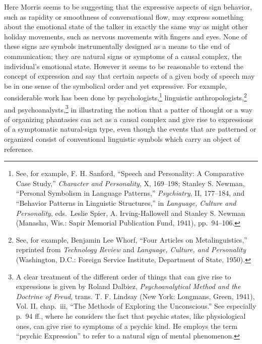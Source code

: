 \documentclass[twoside,symmetric,nobib,justified]{tufte-book}
\begin{document}
\noindent Here Morris seems to be suggesting that the expressive aspects of sign
behavior, such as rapidity or smoothness of conversational flow, may
express something about the emotional state of the talker in exactly the
same way as might other holiday movements, such as nervous movements
with fingers and eyes. None of these signs are symbols instrumentally
designed as a means to the end of communication; they are natural signs
or symptoms of a causal complex, the individual's emotional state.
However it seems to be reasonable to extend the concept of expression
and say that certain aspects of a given body of speech may be in one
sense of the symbolical order and yet expressive. For example,
considerable work has been done by psychologists,\footnote{See, for
  example, F. H. Sanford, ``Speech and Personality: A Comparative Case
  Study,'' \emph{Character and Personality}, X, 169--198; Stanley S.
  Newman, ``Personal Symbolism in Language Patterns,''
  \emph{Psychiatry}, II, 177--184, and ``Behavior Patterns in Linguistic
  Structures,'' in \emph{Language, Culture and Personality}, eds.~Leslie
  Spier, A. Irving-Hallowell and Stanley S. Newman (Manasha, Wis.: Sapir
  Memorial Publication Fund, 1941), pp.~94--106.} linguistic
anthropologists,\footnote{See, for example, Benjamin Lee Whorf, ``Four
  Articles on Metalinguistics,'' reprinted from \emph{Technology Review}
  and \emph{Language, Culture, and Personality} (Washington, D.C.:
  Foreign Service Institute, Department of State, 1950).} and
psychoanalysts,\footnote{A clear treatment of the different order of
  things that can give rise to expressions is given by Roland Dalbiez,
  \emph{Psychoanalytical Method and the Doctrine of Freud}, trans. T. F.
  Lindsay (New York: Longmans, Green, 1941), Vol. II, chap.~iii, ``The
  Methods of Exploring the Unconscious.'' See especially p.~94 ff.,
  where he considers the fact that psychic states, like physiological
  ones, can give rise to symptoms of a psychic kind. He employs the term
  ``psychic Expression'' to refer to a natural sign of mental
  phenomenon.} in illustrating the notion that a patter of thought or a
way of organizing phantasies can act as a causal complex and give rise
to expressions of a symptomatic natural-sign type, even though the
events that are patterned or organized consist of conventional
linguistic symbols which carry an object of reference.
\end{document}
